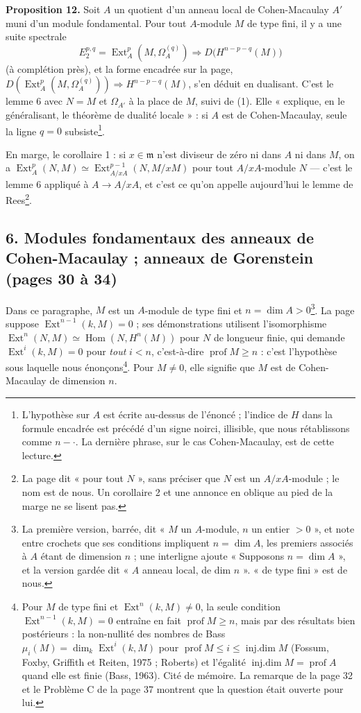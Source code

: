 \documentclass[11pt,a4paper]{article}
\begin{document}
\textbf{Proposition 12.} Soit $A$ un quotient d'un anneau local de
Cohen-Macaulay $A'$ muni d'un module fondamental. Pour tout $A$-module $M$ de
type fini, il y a une suite spectrale
\[
  E_2^{p,q} = \operatorname{Ext}^p_A(M, \Omega_A^{(q)}) \Rightarrow
  D\bigl(H^{n-p-q}(M)\bigr)
\]
(à complétion près), et la forme encadrée sur la page, $D(\operatorname{Ext}^p_A(M,
\Omega_A^{(q)})) \Rightarrow H^{n-p-q}(M)$, s'en déduit en dualisant. C'est le
lemme 6 avec $N = M$ et $\Omega_{A'}$ à la place de $M$, suivi de (1). Elle
« explique, en le généralisant, le théorème de dualité locale » : si $A$ est de
Cohen-Macaulay, seule la ligne $q = 0$ subsiste\footnote{L'hypothèse sur $A$
est écrite au-dessus de l'énoncé ; l'indice de $H$ dans la formule encadrée est
précédé d'un signe noirci, illisible, que nous rétablissons comme $n - \cdot$.
La dernière phrase, sur le cas Cohen-Macaulay, est de cette lecture.}.

En marge, le corollaire 1 : si $x \in \mathfrak{m}$ n'est diviseur de zéro ni
dans $A$ ni dans $M$, on a $\operatorname{Ext}^p_A(N, M) \simeq
\operatorname{Ext}^{p-1}_{A/xA}(N, M/xM)$ pour tout $A/xA$-module $N$ ---
c'est le lemme 6 appliqué à $A \to A/xA$, et c'est ce qu'on appelle aujourd'hui
le lemme de Rees\footnote{La page dit « pour tout $N$ », sans préciser que $N$
est un $A/xA$-module ; le nom est de nous. Un corollaire 2 et une annonce en
oblique au pied de la marge ne se lisent pas.}.

\subsection*{6. Modules fondamentaux des anneaux de Cohen-Macaulay ; anneaux de Gorenstein (pages 30 à 34)}

Dans ce paragraphe, $M$ est un $A$-module de type fini et $n = \dim A >
0$\footnote{La première version, barrée, dit « $M$ un $A$-module, $n$ un
entier $> 0$ », et note entre crochets que ses conditions impliquent $n = \dim
A$, les premiers associés à $A$ étant de dimension $n$ ; une interligne ajoute
« Supposons $n = \dim A$ », et la version gardée dit « $A$ anneau local, de dim
$n$ ». « de type fini » est de nous.}. La page suppose
$\operatorname{Ext}^{n-1}(k, M) = 0$ ; ses démonstrations utilisent
l'isomorphisme $\operatorname{Ext}^n(N, M) \simeq \operatorname{Hom}(N,
H^n(M))$ pour $N$ de longueur finie, qui demande $\operatorname{Ext}^i(k, M) =
0$ pour \emph{tout} $i < n$, c'est-à-dire $\operatorname{prof} M \geqslant n$ :
c'est l'hypothèse sous laquelle nous énonçons\footnote{Pour $M$ de type fini et
$\operatorname{Ext}^n(k, M) \neq 0$, la seule condition
$\operatorname{Ext}^{n-1}(k, M) = 0$ entraîne en fait $\operatorname{prof} M
\geqslant n$, mais par des résultats bien postérieurs : la non-nullité des
nombres de Bass $\mu_i(M) = \dim_k \operatorname{Ext}^i(k, M)$ pour
$\operatorname{prof} M \leqslant i \leqslant \operatorname{inj.dim} M$
(Fossum, Foxby, Griffith et Reiten, 1975 ; Roberts) et l'égalité
$\operatorname{inj.dim} M = \operatorname{prof} A$ quand elle est finie (Bass,
1963). Cité de mémoire. La remarque de la page 32 et le Problème C de la page
37 montrent que la question était ouverte pour lui.}. Pour $M \neq 0$, elle
signifie que $M$ est de Cohen-Macaulay de dimension $n$.
\end{document}
